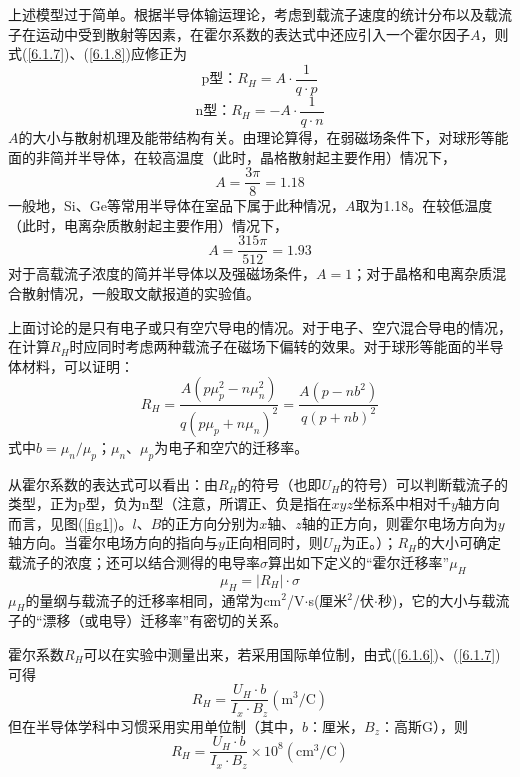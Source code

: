\documentclass[a4paper]{article}
\begin{document}
上述模型过于简单。根据半导体输运理论，考虑到载流子速度的统计分布以及载流子在运动中受到散射等因素，在霍尔系数的表达式中还应引入一个霍尔因子$A$，则式(\ref{6.1.7})、(\ref{6.1.8})应修正为
\begin{equation}\label{6.1.9}
\text{p型：}R_H=A\cdot\frac{1}{q\cdot p}
\end{equation}
\begin{equation}\label{6.1.10}
\text{n型：}R_H=-A\cdot\frac{1}{q\cdot n}
\end{equation}
$A$的大小与散射机理及能带结构有关。由理论算得，在弱磁场条件下，对球形等能面的非简并半导体，在较高温度（此时，晶格散射起主要作用）情况下，
\begin{equation*}
A=\frac{3\pi}{8}=1.18
\end{equation*}
一般地，Si、Ge等常用半导体在室品下属于此种情况，$A$取为1.18。在较低温度（此时，电离杂质散射起主要作用）情况下，
\begin{equation*}
A=\frac{315\pi}{512}=1.93
\end{equation*}
对于高载流子浓度的简并半导体以及强磁场条件，$A=1$；对于晶格和电离杂质混合散射情况，一般取文献报道的实验值。

上面讨论的是只有电子或只有空穴导电的情况。对于电子、空穴混合导电的情况，在计算$R_H$时应同时考虑两种载流子在磁场下偏转的效果。对于球形等能面的半导体材料，可以证明：
\begin{equation}\label{6.1.11}
R_H=\frac{A(p\mu_p^2-n\mu_n^2)}{q(p\mu_p+n\mu_n)^2}=\frac{A(p-nb^2)}{q(p+nb)^2}
\end{equation}
式中$b=\mu_n/\mu_p$；$\mu_n$、$\mu_p$为电子和空穴的迁移率。

从霍尔系数的表达式可以看出：由$R_H$的符号（也即$U_H$的符号）可以判断载流子的类型，正为p型，负为n型（注意，所谓正、负是指在$xyz$坐标系中相对千$y$轴方向而言，见图(\ref{fig1})。$l$、$B$的正方向分别为$x$轴、$z$轴的正方向，则霍尔电场方向为$y$轴方向。当霍尔电场方向的指向与$y$正向相同时，则$U_H$为正。）；$R_H$的大小可确定载流子的浓度；还可以结合测得的电导率$\sigma$算出如下定义的“霍尔迁移率”$\mu_H$
\begin{equation}\label{6.1.12}
\mu_H=|R_H|\cdot \sigma
\end{equation}
$\mu_H$的量纲与载流子的迁移率相同，通常为cm$^2$/V$\cdot$s(厘米$^2$/伏$\cdot$秒)，它的大小与载流子的“漂移（或电导）迁移率”有密切的关系。

霍尔系数$R_H$可以在实验中测量出来，若采用国际单位制，由式(\ref{6.1.6})、(\ref{6.1.7})可得
\begin{equation}\label{6.1.13}
R_H=\frac{U_H \cdot b}{I_x \cdot B_z}(\text{m}^3/\text{C})
\end{equation}
但在半导体学科中习惯采用实用单位制（其中，$b$：厘米，$B_z$：高斯G），则
\begin{equation*}
R_H=\frac{U_H \cdot b}{I_x \cdot B_z}\times 10^8(\text{cm}^3/\text{C})
\end{equation*}
\end{document}
